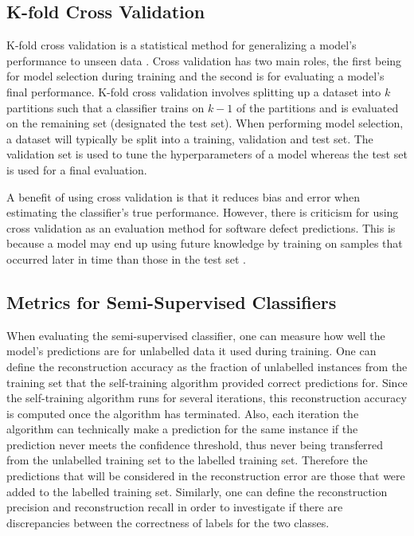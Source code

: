 \documentclass[../main.tex]{subfiles}
\begin{document}
\subsection{K-fold Cross Validation}

K-fold cross validation is a statistical method for generalizing a model's performance to unseen data \cite{kale2011cross}. Cross validation has two main roles, the first being for model selection during training and the second is for evaluating a model's final performance. K-fold cross validation involves splitting up a dataset into $k$ partitions such that a classifier trains on $k-1$ of the partitions and is evaluated on the remaining set (designated the test set). When performing model selection, a dataset will typically be split into a training, validation and test set. The validation set is used to tune the hyperparameters of a model whereas the test set is used for a final evaluation.

A benefit of using cross validation is that it reduces bias and error when estimating the classifier's true performance. However, there is criticism for using cross validation as an evaluation method for software defect predictions. This is because a model may end up using future knowledge by training on samples that occurred later in time than those in the test set \cite{tan2015online}. 

\subsection{Metrics for Semi-Supervised Classifiers}

When evaluating the semi-supervised classifier, one can measure how well the model's predictions are for unlabelled data it used during training. One can define the reconstruction accuracy as the fraction of unlabelled instances from the training set that the self-training algorithm provided correct predictions for. Since the self-training algorithm runs for several iterations, this reconstruction accuracy is computed once the algorithm has terminated. Also, each iteration the algorithm can technically make a prediction for the same instance if the prediction never meets the confidence threshold, thus never being transferred from the unlabelled training set to the labelled training set. Therefore the predictions that will be considered in the reconstruction error are those that were added to the labelled training set. Similarly, one can define the reconstruction precision and reconstruction recall in order to investigate if there are discrepancies between the correctness of labels for the two classes.
\end{document}
